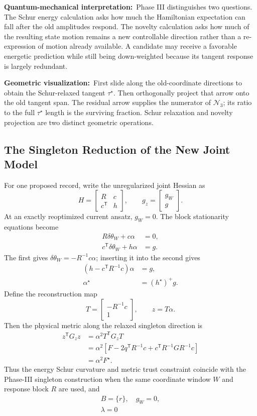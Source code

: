 \documentclass[10pt,twocolumn]{article}
\newcommand{\phys}[1]{\par\noindent\textbf{Quantum-mechanical interpretation:}\ #1\par}
\newcommand{\geom}[1]{\par\noindent\textbf{Geometric visualization:}\ \textcolor{teal!70!black}{#1}\par}
\begin{document}
\phys{Phase III distinguishes two questions. The Schur energy calculation asks
how much the Hamiltonian expectation can fall after the old amplitudes respond.
The novelty calculation asks how much of the resulting state motion remains a
new controllable direction rather than a re-expression of motion already
available. A candidate may receive a favorable energetic prediction while
still being down-weighted because its tangent response is largely redundant.}

\geom{First slide along the old-coordinate directions to obtain the
Schur-relaxed tangent \(\tau^\star\). Then orthogonally project that arrow onto
the old tangent span. The residual arrow supplies the numerator of
\(\mathcal N_3\); its ratio to the full \(\tau^\star\) length is the surviving
fraction. Schur relaxation and novelty projection are two distinct geometric
operations.}

\subsection*{The Singleton Reduction of the New Joint Model}

For one proposed record, write the unregularized joint Hessian as
\[
H=\begin{bmatrix}R&c\\c^{\mathsf T}&h\end{bmatrix},
\qquad
g_z=
\begin{bmatrix}g_W\\g\end{bmatrix}.
\]
At an exactly reoptimized current ansatz, \(g_W=0\). The block stationarity
equations become
\begin{align*}
R\delta\theta_W+c\alpha&=0,\\
c^{\mathsf T}\delta\theta_W+h\alpha&=g.
\end{align*}
The first gives \(\delta\theta_W=-R^{-1}c\alpha\); inserting it into the
second gives
\begin{align*}
\left(h-c^{\mathsf T}R^{-1}c\right)\alpha&=g,\\
\alpha^\star&=(h^\star)^+g.
\end{align*}
Define the reconstruction map
\[
T=\begin{bmatrix}-R^{-1}c\\1\end{bmatrix},
\qquad z=T\alpha.
\]
Then the physical metric along the relaxed singleton direction is
\begin{align*}
z^{\mathsf T}G_z z
&=\alpha^2T^{\mathsf T}G_zT\\
&=\alpha^2\left[
F-2q^{\mathsf T}R^{-1}c
+c^{\mathsf T}R^{-1}G R^{-1}c
\right]\\
&=\alpha^2F^\star.
\end{align*}
Thus the energy Schur curvature and metric trust constraint coincide with the
Phase-III singleton construction when the same coordinate window \(W\) and
response block \(R\) are used, and
\[
\boxed{
\begin{gathered}
B=\{r\},\quad g_W=0,\\
\lambda=0
\end{gathered}}
\]
\end{document}
